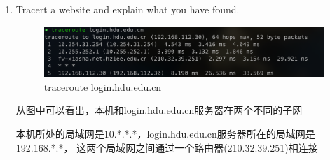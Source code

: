 \documentclass[a4paper]{ctexart}
\begin{document}
\begin{enumerate}
      \item Tracert a website and explain what you have found.
      \begin{figure}[H]
        \includegraphics*[width=1.0\textwidth]{fig/traceroute.png}
        \caption{traceroute login.hdu.edu.cn}
      \end{figure}
      从图中可以看出，本机和login.hdu.edu.cn服务器在两个不同的子网

      本机所处的局域网是10.*.*.*，login.hdu.edu.cn服务器所在的局域网是192.168.*.*，
      这两个局域网之间通过一个路由器(210.32.39.251)相连接

    \end{enumerate}

    \newpage
\end{document}
